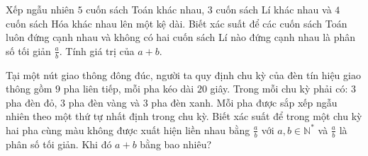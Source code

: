 \begin{vd}
    Xếp ngẫu nhiên $5$ cuốn sách Toán khác nhau, $3$ cuốn sách Lí khác nhau và $4$ cuốn sách Hóa khác nhau lên một kệ dài. Biết xác suất để các cuốn sách Toán luôn đứng cạnh nhau và không có hai cuốn sách Lí nào đứng cạnh nhau là phân số tối giản $\frac{a}{b}$. Tính giá trị của $a+b$.
\end{vd}
\begin{vd}
    Tại một nút giao thông đông đúc, người ta quy định chu kỳ của đèn tín hiệu giao thông gồm $9$ pha liên tiếp, mỗi pha kéo dài $20$ giây. Trong mỗi chu kỳ phải có: $3$ pha đèn đỏ, $3$ pha đèn vàng và $3$ pha đèn xanh. Mỗi pha được sắp xếp ngẫu nhiên theo một thứ tự nhất định trong chu kỳ. Biết xác suất để trong một chu kỳ hai pha cùng màu không được xuất hiện liền nhau bằng $\frac{a}{b}$ với $a,b \in \mathbb{N}^*$ và $\frac{a}{b}$ là phân số tối giản. Khi đó $a+b$ bằng bao nhiêu?
\end{vd}

